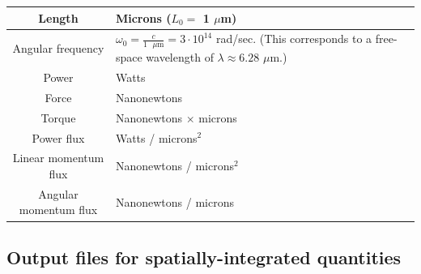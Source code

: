 \documentclass[letterpaper]{article}
\begin{document}
\begin{center}
\renewcommand{\arraystretch}{1.5}
\begin{tabular}{|c|p{}|}\hline
 Length            & Microns ($L_0=$ 1 $\mu$m)
\\\hline
 Angular frequency & $\omega_0=\frac{c}{1\text{ $\mu$m}}
                      =3\cdot 10^{14}$ rad/sec. 
                     (This corresponds to a free-space 
                      wavelength of 
                      $\lambda\approx 6.28$ $\mu$m.)
\\\hline
 Power             & Watts 
\\\hline
 Force             & Nanonewtons
\\\hline
 Torque            & Nanonewtons $\times$ microns
\\\hline
 Power flux        & Watts / microns$^2$
\\\hline
 Linear momentum flux  & Nanonewtons / microns$^2$
\\\hline
 Angular momentum flux & Nanonewtons / microns
\\\hline
\end{tabular}
\end{center}
\renewcommand{\arraystretch}{1.0}
\newpage
\subsection{Output files for spatially-integrated quantities}
\end{document}
